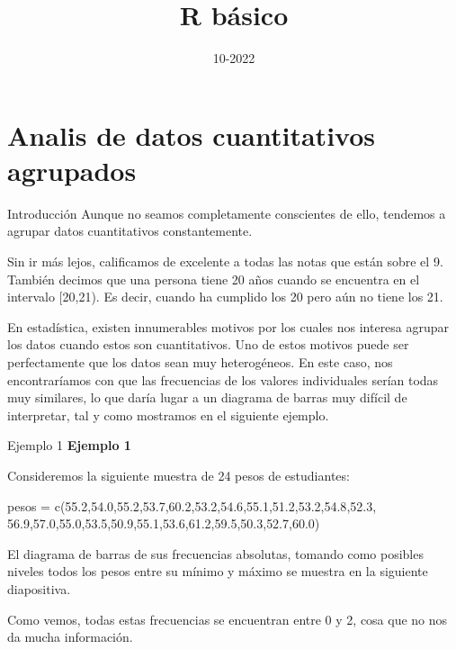 \documentclass[
  ignorenonframetext,
  aspectratio=169]{beamer}
\title{R básico}
\author{}
\date{\vspace{-2.5em}10-2022}
\newenvironment{Shaded}{\begin{snugshade}}{\end{snugshade}}
\newcommand{\FloatTok}[1]{\textcolor[rgb]{0.00,0.00,0.81}{#1}}
\newcommand{\FunctionTok}[1]{\textcolor[rgb]{0.00,0.00,0.00}{#1}}
\newcommand{\NormalTok}[1]{#1}
\newcommand{\OtherTok}[1]{\textcolor[rgb]{0.56,0.35,0.01}{#1}}
\begin{document}
\frame{\titlepage}

\begin{frame}[allowframebreaks]
  \tableofcontents[hideallsubsections]
\end{frame}
\hypertarget{analis-de-datos-cuantitativos-agrupados}{%
\section{Analis de datos cuantitativos
agrupados}\label{analis-de-datos-cuantitativos-agrupados}}

\begin{frame}{Introducción}
\protect\hypertarget{introducciuxf3n}{}
Aunque no seamos completamente conscientes de ello, tendemos a agrupar
datos cuantitativos constantemente.

Sin ir más lejos, calificamos de excelente a todas las notas que están
sobre el 9. También decimos que una persona tiene 20 años cuando se
encuentra en el intervalo {[}20,21). Es decir, cuando ha cumplido los 20
pero aún no tiene los 21.

En estadística, existen innumerables motivos por los cuales nos interesa
agrupar los datos cuando estos son cuantitativos. Uno de estos motivos
puede ser perfectamente que los datos sean muy heterogéneos. En este
caso, nos encontraríamos con que las frecuencias de los valores
individuales serían todas muy similares, lo que daría lugar a un
diagrama de barras muy difícil de interpretar, tal y como mostramos en
el siguiente ejemplo.
\end{frame}

\begin{frame}[fragile]{Ejemplo 1}
\protect\hypertarget{ejemplo-1}{}
\textbf{Ejemplo 1}

Consideremos la siguiente muestra de 24 pesos de estudiantes:

\begin{Shaded}
\begin{Highlighting}[]
\NormalTok{pesos }\OtherTok{=} \FunctionTok{c}\NormalTok{(}\FloatTok{55.2}\NormalTok{,}\FloatTok{54.0}\NormalTok{,}\FloatTok{55.2}\NormalTok{,}\FloatTok{53.7}\NormalTok{,}\FloatTok{60.2}\NormalTok{,}\FloatTok{53.2}\NormalTok{,}\FloatTok{54.6}\NormalTok{,}\FloatTok{55.1}\NormalTok{,}\FloatTok{51.2}\NormalTok{,}\FloatTok{53.2}\NormalTok{,}\FloatTok{54.8}\NormalTok{,}\FloatTok{52.3}\NormalTok{,}
          \FloatTok{56.9}\NormalTok{,}\FloatTok{57.0}\NormalTok{,}\FloatTok{55.0}\NormalTok{,}\FloatTok{53.5}\NormalTok{,}\FloatTok{50.9}\NormalTok{,}\FloatTok{55.1}\NormalTok{,}\FloatTok{53.6}\NormalTok{,}\FloatTok{61.2}\NormalTok{,}\FloatTok{59.5}\NormalTok{,}\FloatTok{50.3}\NormalTok{,}\FloatTok{52.7}\NormalTok{,}\FloatTok{60.0}\NormalTok{)}
\end{Highlighting}
\end{Shaded}

El diagrama de barras de sus frecuencias absolutas, tomando como
posibles niveles todos los pesos entre su mínimo y máximo se muestra en
la siguiente diapositiva.

Como vemos, todas estas frecuencias se encuentran entre 0 y 2, cosa que
no nos da mucha información.
\end{frame}
\end{document}
